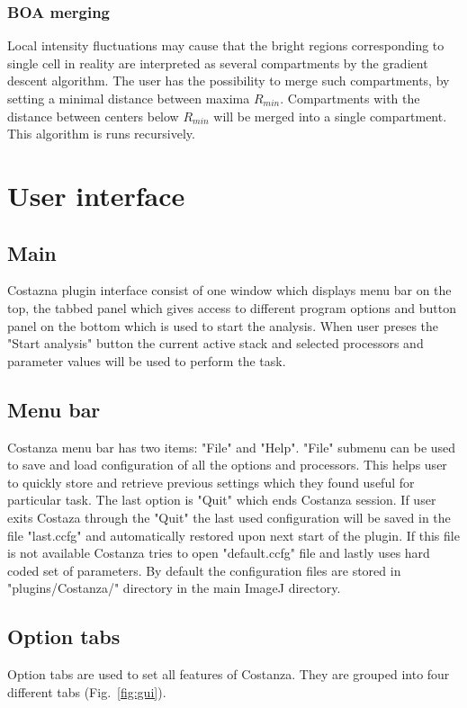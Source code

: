 \documentclass[a4paper,12pt]{article}
\begin{document}
\subsubsection{BOA merging}
Local intensity fluctuations may cause that the bright regions corresponding to single cell in reality
are interpreted as several
compartments by the gradient descent algorithm. The user has the possibility
to merge such compartments, by setting a minimal distance between maxima
$R_{min}$. Compartments with the distance between centers below $R_{min}$ will be
merged into a single compartment. This algorithm is runs recursively.

\section{User interface}

\subsection{Main}
Costazna plugin interface consist of one window which displays menu bar on the top, the tabbed panel which gives access to different program options and button panel on the bottom which is used to start the analysis. When user preses the "Start analysis" button the current active stack and selected processors and parameter values will be used to perform the task.
 
\subsection{Menu bar}
Costanza menu bar has two items: "File" and "Help". "File" submenu can be used to save and load configuration of all the options and processors. This helps user to quickly store and retrieve previous settings which they found useful for particular task. The last option is "Quit" which ends Costanza session. If user exits Costaza through the "Quit" the last used configuration will be saved in the file "last.ccfg" and automatically restored upon next start of the plugin. If this file is not available Costanza tries to open "default.ccfg" file and lastly uses hard coded set of parameters. By default the configuration files are stored in "plugins/Costanza/" directory in the main ImageJ directory.
 
\subsection{Option tabs}
Option tabs are used to set all features of Costanza. They are grouped into four different tabs (Fig.~\ref{fig:gui}). 
\end{document}
